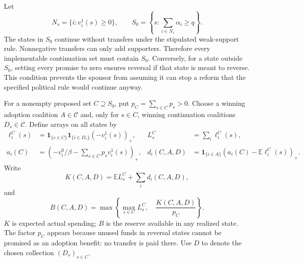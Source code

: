 \documentclass[11pt]{article}
\theoremstyle{definition}
\begin{document}
Let
\[
 N_s=\{i:v_i^1(s)\geq0\},\qquad
 S_0=\left\{s:\sum_{i\in N_s}\alpha_i\geq q\right\}.
\]
The states in $S_0$ continue without transfers under the stipulated
weak-support rule. Nonnegative transfers can only add supporters.
Therefore every implementable continuation set must contain $S_0$.
Conversely, for a state outside $S_0$, setting every promise to zero
ensures reversal if that state is meant to reverse. This condition
prevents the sponsor from assuming it can stop a reform that the
specified political rule would continue anyway.

For a nonempty proposed set $C\supseteq S_0$, put
$p_C=\sum_{s\in C}p_s>0$. Choose a winning adoption coalition
$A\in\mathcal C$ and, only for $s\in C$, winning continuation
coalitions $D_s\in\mathcal C$. Define arrays on all states by
\begin{align*}
 \ell_i^C(s)&=\mathbf1_{\{s\in C\}}
        \mathbf1_{\{i\in D_s\}}(-v_i^1(s))_+,
 &L_s^C&=\sum_i\ell_i^C(s),\\
 a_i(C)&=\left(-v_i^0/\beta-
                   \sum_{s\in C}p_sv_i^1(s)\right)_+,
 &d_i(C,A,D)&=\mathbf1_{\{i\in A\}}
          \left(a_i(C)-\mathbb E\ell_i^C(s)\right)_+.
\end{align*}
Write
\[
 K(C,A,D)=\mathbb E L_s^C+\sum_i d_i(C,A,D),
\]
and
\[
 B(C,A,D)=\max\left\{\max_{s\in C} L_s^C,\quad
                         \frac{K(C,A,D)}{p_C}\right\}.       \tag{1}
\]
$K$ is expected actual spending; $B$ is the reserve available in any
realized state. The factor $p_C$ appears because unused funds in
reversal states cannot be promised as an adoption benefit: no transfer
is paid there. Use $D$ to denote the chosen collection $(D_s)_{s\in C}$.
\end{document}
